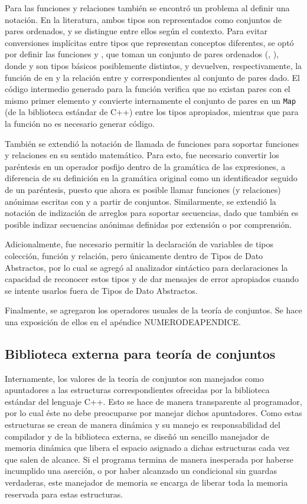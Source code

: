 {{Para las funciones y relaciones también se encontró un problema al definir una
notación. En la literatura, ambos tipos son representados como conjuntos de
pares ordenados, y se distingue entre ellos según el contexto. Para evitar
conversiones implícitas entre tipos que representan conceptos diferentes, se
optó por definir las funciones  y , que toman un conjunto
de pares ordenados (, ), donde  y  son tipos
básicos posiblemente distintos, y devuelven, respectivamente, la función de
 en  y la relación entre  y 
correspondientes al conjunto de pares dado. El código intermedio generado para
la función  verifica que no existan pares con el mismo primer
elemento y convierte internamente el conjunto de pares en un \texttt{Map} (de la
biblioteca estándar de C++) entre los tipos apropiados, mientras que para la
función  no es necesario generar código.

También se extendió la notación de llamada de funciones para soportar funciones
y relaciones en su sentido matemático. Para esto, fue necesario convertir los
paréntesis en un operador posfijo dentro de la gramática de las expresiones, a
diferencia de su definición en la gramática original como un identificador
seguido de un paréntesis, puesto que ahora es posible llamar funciones (y
relaciones) anónimas escritas con  y  a partir de
conjuntos. Similarmente, se extendió la notación de indización de arreglos para
soportar secuencias, dado que también es posible indizar secuencias anónimas
definidas por extensión o por comprensión.

Adicionalmente, fue necesario permitir la declaración de variables de tipos
colección, función y relación, pero únicamente dentro de Tipos de Dato
Abstractos, por lo cual se agregó al analizador sintáctico para declaraciones la
capacidad de reconocer estos tipos y de dar mensajes de error apropiados cuando
se intente usarlos fuera de Tipos de Dato Abstractos.

Finalmente, se agregaron los operadores usuales de la teoría de conjuntos. Se
hace una exposición de ellos en el apéndice NUMERODEAPENDICE.

\subsection{Biblioteca externa para teoría de conjuntos}

Internamente, los valores de la teoría de conjuntos son manejados como
apuntadores a las estructuras correspondientes ofrecidas por la biblioteca
estándar del lenguaje C++. Esto se hace de manera transparente al programador,
por lo cual éste no debe preocuparse por manejar dichos apuntadores. Como  estas
estructuras se crean de manera dinámica y su manejo es responsabilidad del
compilador y de la biblioteca externa, se diseñó un sencillo manejador de
memoria dinámica que libera el espacio asignado a dichas estructuras cada vez
que salen de alcance. Si el programa termina de manera inesperada por haberse
incumplido una aserción, o por haber alcanzado un condicional sin guardas
verdaderas, este manejador de memoria se encarga de liberar toda la memoria
reservada para estas estructuras.


}}
